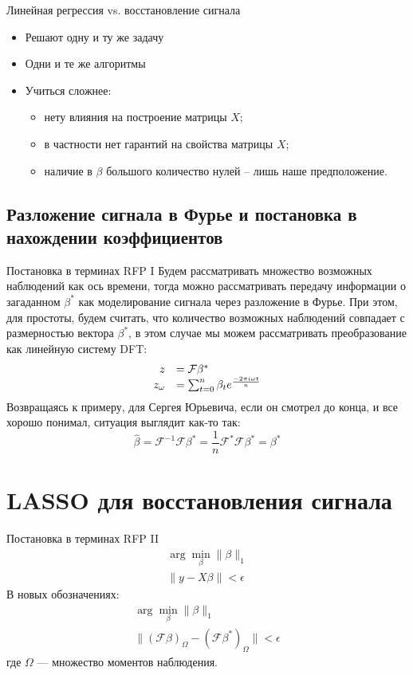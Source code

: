 \documentclass[14pt, fleqn, xcolor={dvipsnames, table}]{beamer}
\begin{document}
\begin{frame}{Линейная регрессия vs. восстановление сигнала}
\begin{itemize}
  \item Решают одну и ту же задачу
  \item Одни и те же алгоритмы
  \item Учиться сложнее:
  \begin{itemize}
    \item нету влияния на построение матрицы $X$;
    \item в частности нет гарантий на свойства матрицы $X$;
    \item наличие в $\beta$ большого количество нулей -- лишь наше предположение.
  \end{itemize}
\end{itemize}
\end{frame}

\subsection{Разложение сигнала в Фурье и постановка в нахождении коэффициентов}
\begin{frame}{Постановка в терминах RFP I}
\small
Будем рассматривать множество возможных наблюдений как ось времени, тогда можно рассматривать передачу информации о загаданном $\beta^*$ как моделирование сигнала через разложение в Фурье. При этом, для простоты, будем считать, что количество возможных наблюдений совпадает с размерностью вектора $\beta^*$, в этом случае мы можем рассматривать преобразование как линейную систему DFT: 
$$\begin{array}{rl}
z & = \mathcal{F} \beta^* \\
z_\omega& = \sum_{t = 0}^n \beta_t e^{-2\pi i \omega t \over n}
\end{array}$$
Возвращаясь к примеру, для Сергея Юрьевича, если он смотрел до конца, и все хорошо понимал, ситуация выглядит как-то так:
$$
\hat{\beta} = \mathcal{F}^{-1} \mathcal{F} \beta^* = \frac{1}{n}\mathcal{F^*} \mathcal{F} \beta^* = \beta^*
$$
\end{frame}

\section{LASSO для восстановления сигнала}

\begin{frame}{Постановка в терминах RFP II}
  $$\begin{array}{l}
  \arg \min_\beta\|\beta\|_1\\
  \|y - X\beta\| < \epsilon
  \end{array}$$
 В новых обозначениях:
$$\begin{array}{l}
\arg \min_\beta \|\beta\|_1 \\
\|(\mathcal{F}\beta)_\Omega - (\mathcal{F}\beta^*)_\Omega\| < \epsilon
\end{array}$$
где $\Omega$ --- множество моментов наблюдения.
\end{frame}
\end{document}
